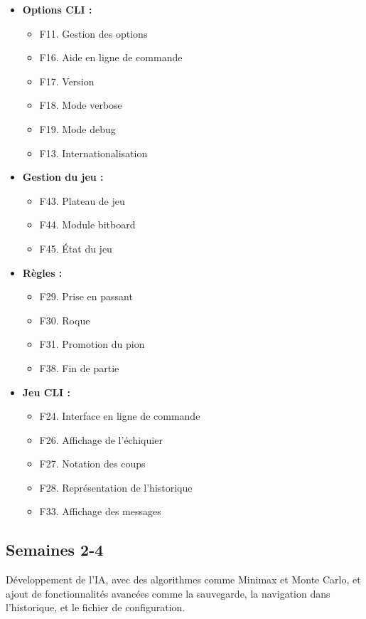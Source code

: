 \documentclass{article}
\begin{document}
\begin{itemize}
    \item \textbf{Options CLI :}
    \begin{itemize}
        \item F11. Gestion des options
        \item F16. Aide en ligne de commande
        \item F17. Version
        \item F18. Mode verbose
        \item F19. Mode debug
        \item F13. Internationalisation
    \end{itemize}
    \item \textbf{Gestion du jeu :}
    \begin{itemize}
        \item F43. Plateau de jeu
        \item F44. Module bitboard
        \item F45. État du jeu
    \end{itemize}
    \item \textbf{Règles :}
    \begin{itemize}
        \item F29. Prise en passant
        \item F30. Roque
        \item F31. Promotion du pion
        \item F38. Fin de partie
    \end{itemize}
    \item \textbf{Jeu CLI :}
    \begin{itemize}
        \item F24. Interface en ligne de commande
        \item F26. Affichage de l'échiquier
        \item F27. Notation des coups
        \item F28. Représentation de l'historique
        \item F33. Affichage des messages
    \end{itemize}
\end{itemize}

\subsection{Semaines 2-4}

Développement de l'IA, avec des algorithmes comme Minimax et Monte Carlo, et ajout de fonctionnalités avancées comme la sauvegarde, la navigation dans l'historique, et le fichier de configuration.
\end{document}
